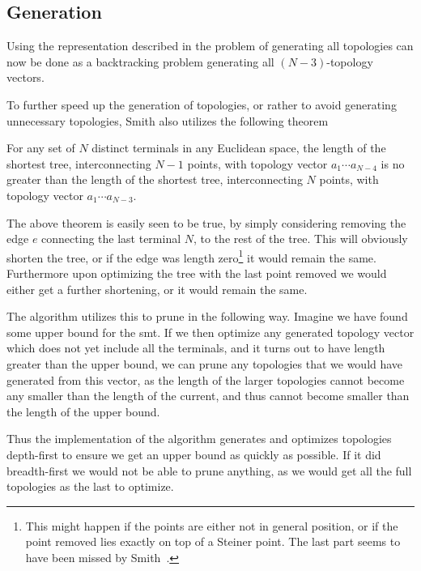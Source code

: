 \subsection{Generation}
\label{sec:generation}

Using the representation described in  the problem of
generating all topologies can now be done as a backtracking problem generating
all $(N-3)$-topology vectors.

To further speed up the generation of topologies, or rather to avoid generating
unnecessary topologies, Smith also utilizes the following theorem

\begin{theorem}
For any set of $N$ distinct terminals in any Euclidean space, the length of
the shortest tree, interconnecting $N-1$ points, with topology vector $a_1
\cdots a_{N-4}$ is no greater than the length of the shortest tree,
interconnecting $N$ points, with topology vector $a_1 \cdots a_{N-3}$.
\end{theorem}

The above theorem is easily seen to be true, by simply considering removing the
edge $e$ connecting the last terminal $N$, to the rest of the tree. This
will obviously shorten the tree, or if the edge was length zero\footnote{This
  might happen if the points are either not in general position, or if the point
  removed lies exactly on top of a Steiner point. The last part seems to have
  been missed by Smith~\cite[p.~144]{Smith1992}.} it would remain the
same. Furthermore upon optimizing the tree with the last point removed we would
either get a further shortening, or it would remain the same.

The algorithm utilizes this to prune in the following way. Imagine we have found
some upper bound for the \gls{smt}. If we then optimize any generated topology
vector which does not yet include all the terminals, and it turns out to
have length greater than the upper bound, we can prune any topologies that we
would have generated from this vector, as the length of the larger topologies
cannot become any smaller than the length of the current, and thus cannot become
smaller than the length of the upper bound.

Thus the implementation of the algorithm generates and optimizes topologies
depth-first to ensure we get an upper bound as quickly as possible. If it did
breadth-first we would not be able to prune anything, as we would get all the
full topologies as the last to optimize.

